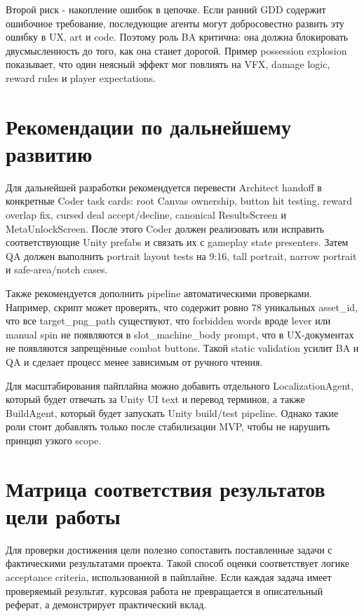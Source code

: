 \documentclass[a4paper,12pt]{report}
\newcommand{\file}[1]{\path{#1}}
\begin{document}
Второй риск - накопление ошибок в цепочке. Если ранний GDD содержит ошибочное требование, последующие агенты могут добросовестно развить эту ошибку в UX, art и code. Поэтому роль BA критична: она должна блокировать двусмысленность до того, как она станет дорогой. Пример possession explosion показывает, что один неясный эффект мог повлиять на VFX, damage logic, reward rules и player expectations.


\section{Рекомендации по дальнейшему развитию}

Для дальнейшей разработки рекомендуется перевести Architect handoff в конкретные Coder task cards: root Canvas ownership, button hit testing, reward overlap fix, cursed deal accept/decline, canonical ResultsScreen и MetaUnlockScreen. После этого Coder должен реализовать или исправить соответствующие Unity prefabs и связать их с gameplay state presenters. Затем QA должен выполнить portrait layout tests на 9:16, tall portrait, narrow portrait и safe-area/notch cases.

Также рекомендуется дополнить pipeline автоматическими проверками. Например, скрипт может проверять, что \file{asset_prompts.csv} содержит ровно 78 уникальных asset\_id, что все target\_png\_path существуют, что forbidden words вроде lever или manual spin не появляются в slot\_machine\_body prompt, что в UX-документах не появляются запрещённые combat buttons. Такой static validation усилит BA и QA и сделает процесс менее зависимым от ручного чтения.

Для масштабирования пайплайна можно добавить отдельного LocalizationAgent, который будет отвечать за Unity UI text и перевод терминов, а также BuildAgent, который будет запускать Unity build/test pipeline. Однако такие роли стоит добавлять только после стабилизации MVP, чтобы не нарушить принцип узкого scope.

\section{Матрица соответствия результатов цели работы}

Для проверки достижения цели полезно сопоставить поставленные задачи с фактическими результатами проекта. Такой способ оценки соответствует логике acceptance criteria, использованной в пайплайне. Если каждая задача имеет проверяемый результат, курсовая работа не превращается в описательный реферат, а демонстрирует практический вклад.
\end{document}
